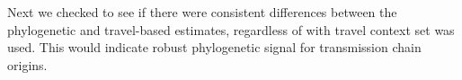 \documentclass[9pt,twocolumn,twoside,lineno]{pnas-new}
\begin{document}
Next we checked to see if there were consistent differences between the phylogenetic and travel-based estimates, regardless of with travel context set was used. This would indicate robust phylogenetic signal for transmission chain origins. 

\end{document}
